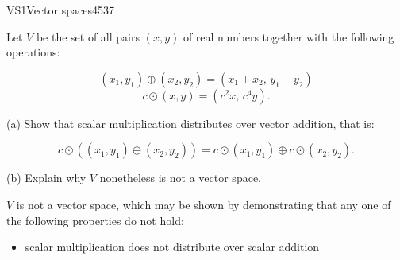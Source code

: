 \begin{exercise}{VS1}{Vector spaces}{4537} 
\begin{exerciseStatement} 

 Let \(V\) be the set of all pairs \((x,y)\) of real numbers together with the following operations: 

 \[(x_1,y_1)\oplus (x_2,y_2)=\left(x_{1} + x_{2},\,y_{1} + y_{2}\right)\]\[c \odot (x,y) =\left(c^{2} x,\,c^{4} y\right).\] 

 (a) Show that scalar multiplication distributes over vector addition, that is: 

 \[
      c\odot \left((x_1,y_1)\oplus(x_2,y_2)\right)=c\odot(x_1,y_1)\oplus c\odot(x_2,y_2).
    \] 

 (b) Explain why \(V\) nonetheless is not a vector space. 

 \end{exerciseStatement}
 \begin{exerciseAnswer} 

 \(V\) is not a vector space, which may be shown by demonstrating that any one of the following properties do not hold: 

 

\begin{itemize}
\item scalar multiplication does not distribute over scalar addition
\end{itemize}

     \end{exerciseAnswer}
 \end{exercise}


